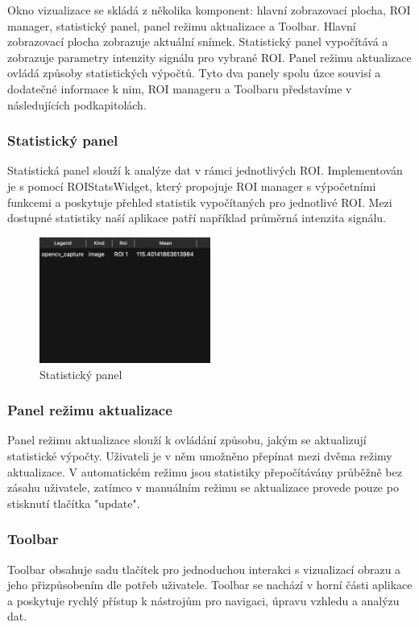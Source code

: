 \documentclass{article}
\begin{document}
Okno vizualizace se skládá z několika komponent: hlavní zobrazovací plocha, ROI manager, statistický panel, panel režimu aktualizace a Toolbar. Hlavní zobrazovací plocha zobrazuje aktuální snímek. Statistický panel vypočítává a zobrazuje parametry intenzity signálu pro vybrané ROI. Panel režimu aktualizace ovládá způsoby statistických výpočtů. Tyto dva panely spolu úzce souvisí a dodatečné informace k nim, ROI manageru a Toolbaru představíme v následujících podkapitolách. 

\subsubsection{Statistický panel}
Statistická panel slouží k analýze dat v rámci jednotlivých ROI. Implementován je s pomocí ROIStatsWidget, který propojuje ROI manager s výpočetními funkcemi a poskytuje přehled statistik vypočítaných pro jednotlivé ROI. Mezi dostupné statistiky naší aplikace patří například průměrná intenzita signálu.
\begin{figure}[htp]
    \centering
    \includegraphics[width=0.5\textwidth]{images/StatistickyPanel.png}
    \caption{Statistický panel}
\end{figure}
\subsubsection{Panel režimu aktualizace}
Panel režimu aktualizace slouží k ovládání způsobu, jakým se aktualizují statistické výpočty. Uživateli je v něm umožněno přepínat mezi dvěma režimy aktualizace. V automatickém režimu jsou statistiky přepočítávány průběžně bez zásahu uživatele, zatímco v manuálním režimu se aktualizace provede pouze po stisknutí tlačítka "update".
\newpage

\subsubsection{Toolbar}
Toolbar obsahuje sadu tlačítek pro jednoduchou interakci s vizualizací obrazu a jeho přizpůsobením dle potřeb uživatele. Toolbar se nachází v horní části aplikace a poskytuje rychlý přístup k nástrojům pro navigaci, úpravu vzhledu a analýzu dat.\\
\end{document}
